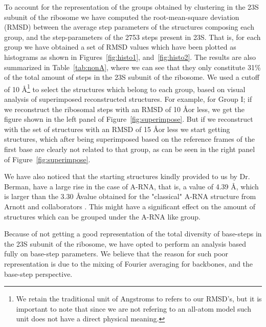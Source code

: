 To account for the representation of the groups obtained by clustering
in   the  23S   subunit  of   the  ribosome   we  have   computed  the
root-mean-square deviation (RMSD)  between the average step parameters
of the structures composing each group, and the step-parameters of the
2753 steps present in 23S.  That is, for each group we have obtained a
set of RMSD  values which have been plotted as  histograms as shown in
Figures~\ref{fig:histo1}, and~\ref{fig:histo2}.   The results are also
summarized in  Table~\ref{tab:nonA}, where we  can see that  they only
constitute 31\% of the total amount of steps in the 23S subunit of the
ribosome.   We  used  a  cutoff  of 10  \AA  \footnote{We  retain  the
  traditional unit  of Angstroms  to refers to  our RMSD's, but  it is
  important  to note that  since we  are not  refering to  an all-atom
  model such unit does not  have a direct physical meaning.} to select
the structures which belong to each group, based on visual analysis of
superimposed reconstructed structures. For example, for Group I; if we
reconstruct the ribosomal steps with an RMSD of 10 \AA or less, we get
the      figure      shown     in      the      left     panel      of
Figure~\ref{fig:superimpose}. But  if we  reconstruct with the  set of
structures with an RMSD of 15 \AA or less we start getting structures,
which after  being superimposed based  on the reference frames  of the
first base  are clearly not related to  that group, as can  be seen in
the right panel of Figure~\ref{fig:superimpose}.

We have also  noticed that the starting structures  kindly provided to
us by Dr. Berman,  have a large rise in the case  of A-RNA, that is, a
value of  4.39 \AA, which is  larger than the 3.30  \AA value obtained
for  the "classical"  A-RNA  structure from  Arnott and  collaborators
\cite{arnott1973}. This might have  a significant effect on the amount
of structures which can be grouped under the A-RNA like group.

Because of not getting a good representation of the total diversity of
base-steps  in the  23S  subunit of  the  ribosome, we  have opted  to
perform an  analysis based fully  on base-step parameters.  We believe
that the reason  for such poor representation is due  to the mixing of
Fourier averaging for backbones, and  the base-step perspective.

